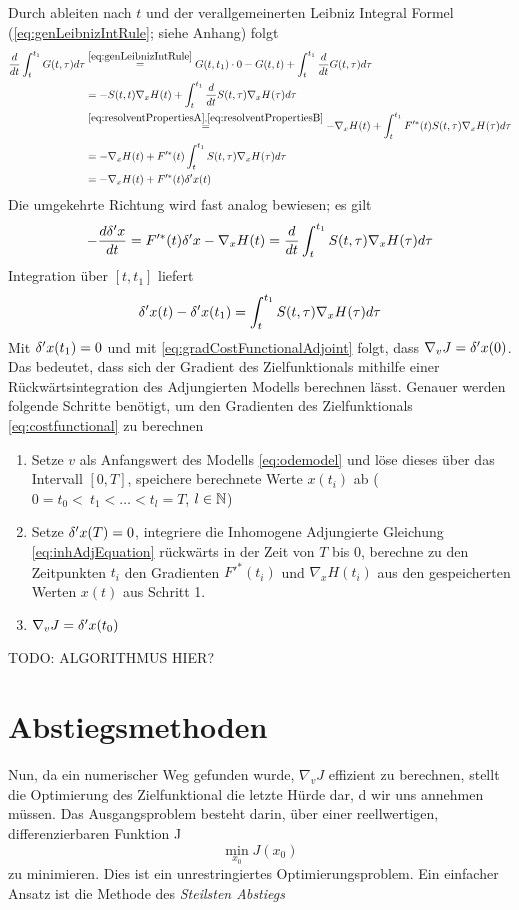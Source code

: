 Durch ableiten nach $t$ und der verallgemeinerten Leibniz Integral Formel (\ref{eq:genLeibnizIntRule}; siehe Anhang) folgt
\begin{equation*}
 \begin{aligned}
 \frac{d}{dt} \int_t^{t_1} G(t,\tau)d\tau  
			 &\overset{\eqref{eq:genLeibnizIntRule}}= G(t,t_1)\cdot 0 - G(t,t) + \int_t^{t_1} \frac{d}{dt}G(t,\tau) d\tau \\
			 &= -S(t,t)\nabla_x H(t) + \int_t^{t_1} \frac{d}{dt}S(t,\tau)\nabla_x H(\tau) d\tau \\
			 &\overset{\eqref{eq:resolventPropertiesA},\eqref{eq:resolventPropertiesB}}= -\nabla_x H(t) + \int_t^{t_1} F'^*(t)S(t,\tau)\nabla_x H(\tau) d\tau \\
			  &= -\nabla_x H(t) +F'^*(t) \int_t^{t_1} S(t,\tau)\nabla_x H(\tau) d\tau \\
			 &= -\nabla_x H(t) +F'^*(t) \delta 'x(t) \\
 \end{aligned}
\end{equation*}
Die umgekehrte Richtung wird fast analog bewiesen; es gilt
\begin{equation*}
 -\frac{d\delta 'x}{dt} = F'^*(t) \delta'x - \nabla_x H(t)
			 = \frac{d}{dt} \int_t^{t_1} S(t,\tau) \nabla_x H(\tau) d\tau
\end{equation*}
Integration über $[t,t_1]$ liefert
\[
 \delta 'x(t) -  \delta 'x(t_1)  = \int_t^{t_1} S(t,\tau) \nabla_x H(\tau) d\tau
\]
Mit $ \delta 'x(t_1) = 0$ und mit \eqref{eq:gradCostFunctionalAdjoint} folgt, dass $\nabla_v J = \delta'x(0)$. Das bedeutet, dass sich der Gradient des Zielfunktionals mithilfe einer Rückwärtsintegration des Adjungierten Modells berechnen lässt.
Genauer werden folgende Schritte benötigt, um den Gradienten des Zielfunktionals \eqref{eq:costfunctional} zu berechnen

\begin{enumerate}
 \item Setze $v$ als Anfangswert des Modells \eqref{eq:odemodel} und löse dieses über das Intervall $[0,T]$, speichere berechnete Werte $x(t_i)$ ab ($0= t_0<~ t_1<\ldots<t_l=T$, $l\in \mathbb{N}$)
 \item Setze $\delta 'x(T) = 0$, integriere die Inhomogene Adjungierte Gleichung \eqref{eq:inhAdjEquation} rückwärts in der Zeit von $T$ bis $0$, berechne zu den Zeitpunkten $t_i$ den Gradienten $F'^*(t_i)$ und $\nabla_x H(t_i)$ aus den gespeicherten Werten $x(t)$ aus Schritt 1.
 \item $\nabla_v J = \delta 'x(t_0)$
\end{enumerate}
TODO: ALGORITHMUS HIER?

\section{Abstiegsmethoden}
Nun, da ein numerischer Weg gefunden wurde, $\nabla_v J$ effizient zu berechnen, stellt die Optimierung des Zielfunktional die letzte Hürde dar, d wir uns annehmen müssen. Das Ausgangsproblem besteht darin, über einer reellwertigen, differenzierbaren Funktion J
\[
 \min_{x_0} J(x_0)
\]
zu minimieren. Dies ist ein unrestringiertes Optimierungsproblem. Ein einfacher Ansatz ist die Methode des \textit{Steilsten Abstiegs}
